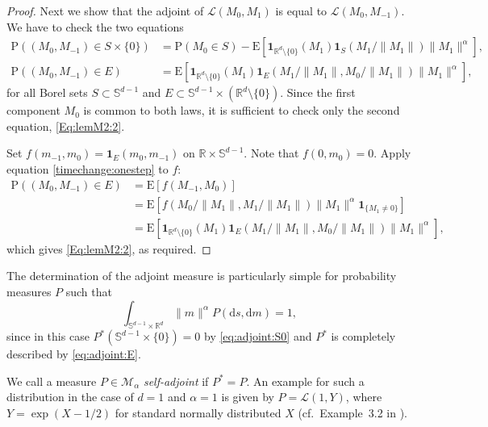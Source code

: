 \documentclass{aptpubarxiv}
\numberwithin{equation}{section}
\begin{document}
\begin{proof}
Next we show that the adjoint of ${\mathcal{L}}(M_0, M_1)$ is equal to ${\mathcal{L}}(M_0, M_{-1})$. We have to check the two equations
\begin{align}
\nonumber
  {\mathrm{P}}((M_0,M_{-1}) \in S \times \{0\})
  &={\mathrm{P}}(M_0 \in S)-{\mathrm{E}}[{\boldsymbol{1}}_{\mathbb{R}^d \setminus\{0\}}(M_1){\boldsymbol{1}}_S(M_1/\|M_1\|)\|M_1\|^\alpha], \\
\label{Eq:lemM2:2}
  {\mathrm{P}}((M_0,M_{-1}) \in E)
  &={\mathrm{E}}[{\boldsymbol{1}}_{\mathbb{R}^d \setminus\{0\}}(M_1){\boldsymbol{1}}_E(M_1/\|M_1\|,M_0/\|M_1\|)\|M_1\|^\alpha],
\end{align}
for all Borel sets $S \subset \mathbb{S}^{d-1}$ and $E \subset \mathbb{S}^{d-1}\times (\mathbb{R}^d\setminus\{0\})$. Since the first component $M_0$ is common to both laws, it is sufficient to check only the second equation, \eqref{Eq:lemM2:2}.

Set $f(m_{-1},m_0)={\boldsymbol{1}}_E(m_0,m_{-1})$ on $\mathbb{R} \times \mathbb{S}^{d-1}$. Note that $f(0,m_0)=0$. Apply equation \eqref{timechange:onestep} to $f$:
\begin{align*} 
  {\mathrm{P}}((M_0,M_{-1}) \in E)
  &= {\mathrm{E}}[f(M_{-1},M_0)] \\
  &= {\mathrm{E}}[f(M_0/\|M_1\|,M_1/\|M_1\|)\|M_1\|^\alpha{\boldsymbol{1}}_{\{M_1 \neq 0\}}] \\
  &= {\mathrm{E}}[{\boldsymbol{1}}_{\mathbb{R}^d \setminus\{0\}}(M_1){\boldsymbol{1}}_E(M_1/\|M_1\|,M_0/\|M_1\|)\|M_1\|^\alpha],
\end{align*}
which gives \eqref{Eq:lemM2:2}, as required. 
\end{proof}

\begin{rem}\label{partsimple} The determination of the adjoint measure is particularly simple for probability measures $P$ such that 
\begin{equation}
\label{eq:partsimple}
  \int_{\mathbb{S}^{d-1} \times \mathbb{R}^d}\|m\|^\alpha P({\mathrm{d}s}, {\mathrm{d}m})=1,  
\end{equation}
since in this case $P^*(\mathbb{S}^{d-1} \times \{ 0 \})=0$ by \eqref{eq:adjoint:S0} and $P^*$ is completely described by \eqref{eq:adjoint:E}.
\end{rem}

\begin{rem}\label{selfadjoint}
We call a measure $P \in \mathcal{M}_\alpha$ \emph{self-adjoint} if $P^\ast=P$. An example for such a distribution in the case of $d=1$ and $\alpha=1$ is given by $P=\mathcal{L}(1,Y)$, where $Y=\exp(X-1/2)$ for standard normally distributed $X$ (cf.\ Example~3.2 in \cite{S07}).
 \end{rem}
\end{document}
